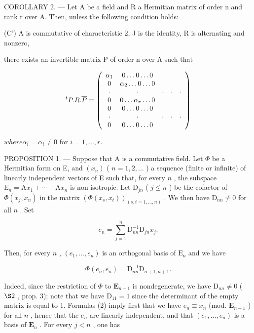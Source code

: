 COROLLARY 2. --- Let A be a field and R a Hermitian matrix of order n and rank r over A. Then, unless the following condition holds:

(C') A is commutative of characteristic 2, J is the identity, R is alternating and nonzero,

there exists an invertible matrix P of order n over A such that

\[
{ } ^ { t } P . R . \overline { { P } } = \left( \begin{array} { c c c c c } \alpha _ { 1 } & 0 \dots 0 \dots 0 \\ 0 & \alpha _ { 2 } \dots 0 \dots 0 \\ \cdot & \cdot & \cdot & \cdot & \cdot \\ 0 & 0 \dots \alpha _ { r } \dots 0 \\ 0 & 0 \dots 0 \dots 0 \\ \cdot & \cdot & \cdot & \cdot & \cdot \\ 0 & 0 \dots 0 \dots 0 \end{array} \right)
\]

\(where \overline{\alpha}_{i} = \alpha_{i} \neq 0 \text{ for } i = 1, \ldots, r.\)

PROPOSITION 1. --- Suppose that A is a commutative field. Let \(\Phi\) be a Hermitian form on E, and \((x_{n})\) ( \(n=1,2,\ldots\) ) a sequence (finite or infinite) of linearly independent vectors of E such that, for every \(n\) , the subspace \(\mathrm{E}_{n}=\mathrm{A}x_{1}+\cdots+\mathrm{A}x_{n}\) is non-isotropic. Let \(\mathrm{D}_{jn}\) ( \(j\leqslant n\) ) be the cofactor of \(\Phi(x_{j},x_{n})\) in the matrix \((\Phi(x_{s},x_{t}))_{(s,t=1,\ldots,n)}\) . We then have \(\mathrm{D}_{nn}\neq0\) for all \(n\) . Set

\[
e _ {n} = \sum_ {j = 1} ^ {n} \mathrm{D} _ {n n} ^ {- 1} \mathrm{D} _ {j n} x _ {j}.\tag{2}
\]

Then, for every \(n\) , \((e_{1},\ldots,e_{n})\) is an orthogonal basis of \(\mathrm{E}_{n}\) and we have

\[
\Phi (e _ {n}, e _ {n}) = \mathrm{D} _ {n n} ^ {- 1} \mathrm{D} _ {n + 1, n + 1}.\tag{3}
\]

Indeed, since the restriction of \(\Phi\) to \(\mathbf{E}_{n-1}\) is nondegenerate, we have \(\mathrm{D}_{nn} \neq 0\) ( \(\S 2\) , prop. 3); note that we have \(\mathrm{D}_{11} = 1\) since the determinant of the empty matrix is equal to 1. Formulas (2) imply first that we have \(e_n \equiv x_n\) (mod. \(\mathbf{E}_{n-1}\) ) for all \(n\) , hence that the \(e_n\) are linearly independent, and that \((e_1, \ldots, e_n)\) is a basis of \(\mathbf{E}_n\) . For every \(j < n\) , one has

